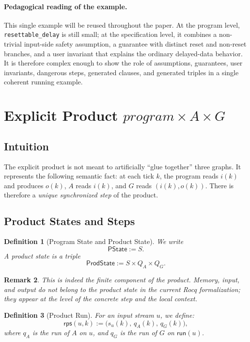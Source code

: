\documentclass[11pt,a4paper]{article}
\newtheorem{definition}{Definition}[section]
\newtheorem{remark}[definition]{Remark}
\newcommand{\run}{\mathsf{run}}
\newcommand{\rps}{\mathsf{rps}}
\begin{document}
\paragraph{Pedagogical reading of the example.}
This single example will be reused throughout the paper. At the program level,
\texttt{resettable\_delay} is still small; at the specification level, it
combines a non-trivial input-side safety assumption, a guarantee with distinct
reset and non-reset branches, and a user invariant that explains the ordinary
delayed-data behavior. It is therefore complex enough to show the role of
assumptions, guarantees, user invariants, dangerous steps, generated clauses,
and generated triples in a single coherent running example.

\section{Explicit Product \texorpdfstring{\(program \times A \times G\)}{program x A x G}}

\subsection{Intuition}

The explicit product is not meant to artificially ``glue together'' three
graphs. It represents the following semantic fact: at each tick \(k\), the
program reads \(i(k)\) and produces \(o(k)\), \(A\) reads \(i(k)\), and
\(G\) reads \((i(k),o(k))\). There is therefore a \emph{unique synchronized
step} of the product.

\subsection{Product States and Steps}

\begin{definition}[Program State and Product State]
We write
\[
\mathsf{PState} := S.
\]
A product state is a triple
\[
\mathsf{ProdState} := S \times Q_A \times Q_G.
\]
\end{definition}

\begin{remark}
This is indeed the \emph{finite} component of the product. Memory, input, and
output do not belong to the product state in the current Rocq formalization;
they appear at the level of the concrete step and the local context.
\end{remark}

\begin{definition}[Product Run]
For an input stream \(u\), we define:
\[
\rps(u,k) :=
\bigl(s_u(k),\, q_A(k),\, q_G(k)\bigr),
\]
where \(q_A\) is the run of \(A\) on \(u\), and \(q_G\) is the run of \(G\) on
\(\run(u)\).
\end{definition}
\end{document}
